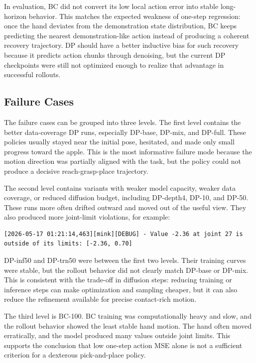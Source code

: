 \documentclass[UTF8]{ctexart}
\newcommand{\code}[1]{\texttt{\detokenize{#1}}}
\begin{document}
In evaluation, BC did not convert its low local action error into stable long-horizon behavior. This matches the expected weakness of one-step regression: once the hand deviates from the demonstration state distribution, BC keeps predicting the nearest demonstration-like action instead of producing a coherent recovery trajectory. DP should have a better inductive bias for such recovery because it predicts action chunks through denoising, but the current DP checkpoints were still not optimized enough to realize that advantage in successful rollouts.

\subsection{Failure Cases}

The failure cases can be grouped into three levels. The first level contains the better data-coverage DP runs, especially DP-base, DP-mix, and DP-full. These policies usually stayed near the initial pose, hesitated, and made only small progress toward the apple. This is the most informative failure mode because the motion direction was partially aligned with the task, but the policy could not produce a decisive reach-grasp-place trajectory.

The second level contains variants with weaker model capacity, weaker data coverage, or reduced diffusion budget, including DP-depth4, DP-10, and DP-50. These runs more often drifted outward and moved out of the useful \code{cam_high} view. They also produced more joint-limit violations, for example:

\begin{lstlisting}
[2026-05-17 01:21:14,463][mink][DEBUG] - Value -2.36 at joint 27 is outside of its limits: [-2.36, 0.70]
\end{lstlisting}

DP-inf50 and DP-trn50 were between the first two levels. Their training curves were stable, but the rollout behavior did not clearly match DP-base or DP-mix. This is consistent with the trade-off in diffusion steps: reducing training or inference steps can make optimization and sampling cheaper, but it can also reduce the refinement available for precise contact-rich motion.

The third level is BC-100. BC training was computationally heavy and slow, and the rollout behavior showed the least stable hand motion. The hand often moved erratically, and the model produced many values outside joint limits. This supports the conclusion that low one-step action MSE alone is not a sufficient criterion for a dexterous pick-and-place policy.
\end{document}
